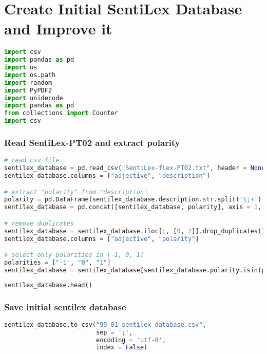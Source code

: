 \hypertarget{create-initial-sentilex-database-and-improve-it}{%
\section{Create Initial SentiLex Database and Improve
it}\label{create-initial-sentilex-database-and-improve-it}}

\begin{lstlisting}[language=Python]
import csv
import pandas as pd
import os
import os.path
import random
import PyPDF2
import unidecode
import pandas as pd
from collections import Counter
import csv
\end{lstlisting}

\hypertarget{read-sentilex-pt02-and-extract-polarity}{%
\subsubsection{Read SentiLex-PT02 and extract
polarity}\label{read-sentilex-pt02-and-extract-polarity}}

\begin{lstlisting}[language=Python]
# read csv file
sentilex_database = pd.read_csv("SentiLex-flex-PT02.txt", header = None)
sentilex_database.columns = ["adjective", "description"]

# extract "polarity" from "description"
polarity = pd.DataFrame(sentilex_database.description.str.split('\;+').str[3].str.split('\=+').str[1])
sentilex_database = pd.concat([sentilex_database, polarity], axis = 1, join = 'outer')

# remove duplicates
sentilex_database = sentilex_database.iloc[:, [0, 2]].drop_duplicates()
sentilex_database.columns = ["adjective", "polarity"]

# select only polarities in [-1, 0, 1]
polarities = ["-1", "0", "1"]
sentilex_database = sentilex_database[sentilex_database.polarity.isin(polarities)]
\end{lstlisting}

\begin{lstlisting}[language=Python]
sentilex_database.head()
\end{lstlisting}

\hypertarget{save-initial-sentilex-database}{%
\subsubsection{Save initial sentilex
database}\label{save-initial-sentilex-database}}

\begin{lstlisting}[language=Python]
sentilex_database.to_csv("99_01_sentilex_database.csv",
                         sep = ';',
                         encoding = 'utf-8',
                         index = False)
\end{lstlisting}

